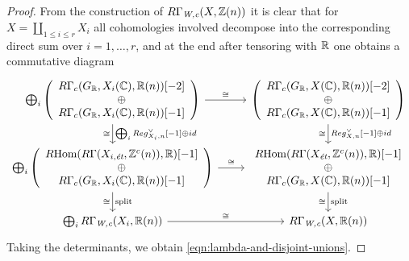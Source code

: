 \documentclass{article}
\numberwithin{equation}{section}
\begin{document}
\begin{lemma}
  \begin{proof}
    From the construction of $R\Gamma_{\text{\it W,c}} (X, \mathbb{Z}(n))$ it is clear that for
    $X = \coprod_{1 \le i \le r} X_i$ all cohomologies involved decompose into
    the corresponding direct sum over $i = 1,\ldots,r$, and at the end after
    tensoring with $\mathbb{R}$ one obtains a commutative diagram
    \[ \begin{tikzcd}
        \bigoplus_i \left(\begin{array}{c} R\Gamma_c (G_\RR, X_i (\CC), \RR (n)) [-2] \\ \oplus \\ R\Gamma_c (G_\RR, X_i (\CC), \RR (n)) [-1] \end{array}\right) \ar{d}{\bigoplus_i Reg_{X_i,n}^\vee [-1] \oplus id}[swap]{\cong} \ar{r}{\cong} & \left(\begin{array}{c} R\Gamma_c (G_\RR, X (\CC), \RR (n)) [-2] \\ \oplus \\ R\Gamma_c (G_\RR, X (\CC), \RR (n)) [-1] \end{array}\right) \ar{d}{Reg_{X,n}^\vee [-1] \oplus id}[swap]{\cong} \\
        \bigoplus_i \left(\begin{array}{c} \RHom (R\Gamma (X_{i,\et}, \ZZ^c (n)), \RR) [-1] \\ \oplus \\ R\Gamma_c (G_\RR, X_i (\CC), \RR (n)) [-1] \end{array}\right) \ar{d}{\text{split}}[swap]{\cong} \ar{r}{\cong} & \begin{array}{c} \RHom (R\Gamma (X_\et, \ZZ^c (n)), \RR) [-1] \\ \oplus \\ R\Gamma_c (G_\RR, X (\CC), \RR (n)) [-1] \end{array} \ar{d}{\text{split}}[swap]{\cong} \\
        \bigoplus_i R\Gamma_\Wc (X_i, \RR (n)) \ar{r}{\cong} & R\Gamma_\Wc (X, \RR (n))
      \end{tikzcd} \]
    Taking the determinants, we obtain \eqref{eqn:lambda-and-disjoint-unions}.
  \end{proof}
\end{lemma}
\end{document}
